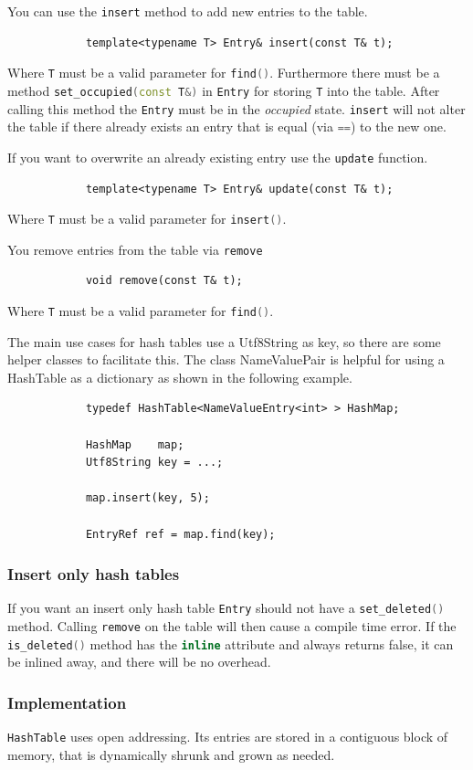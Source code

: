 \documentclass[12pt,a4paper,oneside]{article}
\newcommand{\cpp}[1]{\lstinline[language=C++]{#1}}
\begin{document}
	You can use the \cpp{insert} method to add new entries to the table.
		\begin{lstlisting}
			template<typename T> Entry& insert(const T& t);
		\end{lstlisting}
	Where \cpp{T} must be a valid parameter for \cpp{find()}. 
	Furthermore there must be a method \cpp{set_occupied(const T&)} in \cpp{Entry} for storing \cpp{T} into the table.
	After calling this method the \cpp{Entry} must be in the \emph{occupied} state.
	\cpp{insert} will not alter the table if there already exists an entry that is equal (via \cpp{==}) to the new one.


	If you want to overwrite an already existing entry use the \cpp{update} function.
		\begin{lstlisting}
			template<typename T> Entry& update(const T& t);
		\end{lstlisting}
	Where \cpp{T} must be a valid parameter for \cpp{insert()}. 


	You remove entries from the table via \cpp{remove}
		\begin{lstlisting}
			void remove(const T& t);
		\end{lstlisting}
	Where \cpp{T} must be a valid parameter for \cpp{find()}. 

	The main use cases for hash tables use a Utf8String as key, so there are some helper classes to facilitate this.
	The class NameValuePair is helpful for using a HashTable as a dictionary as shown in the following example.
		\begin{lstlisting}
			typedef HashTable<NameValueEntry<int> > HashMap;

			HashMap    map;
			Utf8String key = ...;

			map.insert(key, 5);

			EntryRef ref = map.find(key);
		\end{lstlisting}

\subsubsection{Insert only hash tables}
	If you want an insert only hash table \cpp{Entry} should not have a \cpp{set_deleted()}
	method. Calling \cpp{remove} on the table will then cause a compile time error.
	If the \cpp{is_deleted()} method has the \cpp{inline} attribute and always returns false,
	it can be inlined away, and there will be no overhead.

\subsubsection{Implementation}
	\cpp{HashTable} uses open addressing.
	Its entries are stored in a contiguous block of memory, that is dynamically shrunk and 
	grown as needed.
\end{document}
